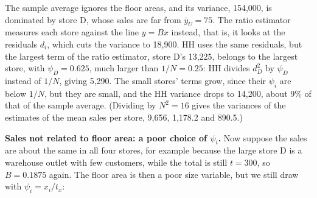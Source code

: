 \documentclass[
  letterpaper,
  DIV=11,
  numbers=noendperiod]{scrreprt}
\renewcommand{\[}{\begin{equation}}
\renewcommand{\]}{\end{equation}}
\begin{document}
The sample average ignores the floor areas, and its variance, 154,000,
is dominated by store D, whose sales are far from \(\bar{y}_U=75\). The
ratio estimator measures each store against the line \(y=Bx\) instead,
that is, it looks at the residuals \(d_i\), which cuts the variance to
18,900. HH uses the same residuals, but the largest term of the ratio
estimator, store D's 13,225, belongs to the largest store, with
\(\psi_D=0.625\), much larger than \(1/N=0.25\): HH divides \(d_D^2\) by
\(\psi_D\) instead of \(1/N\), giving 5,290. The small stores' terms
grow, since their \(\psi_i\) are below \(1/N\), but they are small, and
the HH variance drops to 14,200, about 9\% of that of the sample
average. (Dividing by \(N^2=16\) gives the variances of the estimates of
the mean sales per store, 9,656, 1,178.2 and 890.5.)

\textbf{Sales not related to floor area: a poor choice of \(\psi_i\).}
Now suppose the sales are about the same in all four stores, for example
because the large store D is a warehouse outlet with few customers,
while the total is still \(t=300\), so \(B=0.1875\) again. The floor
area is then a poor size variable, but we still draw with
\(\psi_i=x_i/t_x\):
\end{document}
